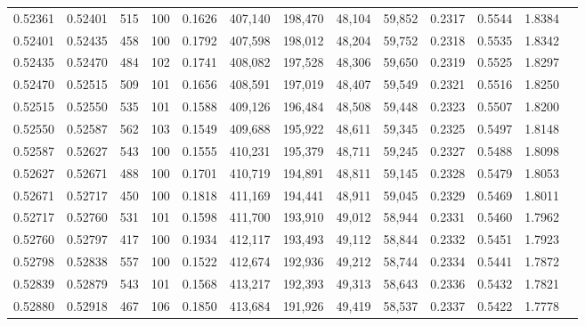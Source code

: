 \begin{tabular}{rrrrrrrrrrrrr}
0.52361 & 0.52401 &   515 & 100 &                                     0.1626 & 407,140 & 198,470 &  48,104 &  59,852 & 0.2317 & 0.5544 & 1.8384 \\
0.52401 & 0.52435 &   458 & 100 &                                     0.1792 & 407,598 & 198,012 &  48,204 &  59,752 & 0.2318 & 0.5535 & 1.8342 \\
0.52435 & 0.52470 &   484 & 102 &                                     0.1741 & 408,082 & 197,528 &  48,306 &  59,650 & 0.2319 & 0.5525 & 1.8297 \\
0.52470 & 0.52515 &   509 & 101 &                                     0.1656 & 408,591 & 197,019 &  48,407 &  59,549 & 0.2321 & 0.5516 & 1.8250 \\
0.52515 & 0.52550 &   535 & 101 &                                     0.1588 & 409,126 & 196,484 &  48,508 &  59,448 & 0.2323 & 0.5507 & 1.8200 \\
0.52550 & 0.52587 &   562 & 103 &                                     0.1549 & 409,688 & 195,922 &  48,611 &  59,345 & 0.2325 & 0.5497 & 1.8148 \\
0.52587 & 0.52627 &   543 & 100 &                                     0.1555 & 410,231 & 195,379 &  48,711 &  59,245 & 0.2327 & 0.5488 & 1.8098 \\
0.52627 & 0.52671 &   488 & 100 &                                     0.1701 & 410,719 & 194,891 &  48,811 &  59,145 & 0.2328 & 0.5479 & 1.8053 \\
0.52671 & 0.52717 &   450 & 100 &                                     0.1818 & 411,169 & 194,441 &  48,911 &  59,045 & 0.2329 & 0.5469 & 1.8011 \\
0.52717 & 0.52760 &   531 & 101 &                                     0.1598 & 411,700 & 193,910 &  49,012 &  58,944 & 0.2331 & 0.5460 & 1.7962 \\
0.52760 & 0.52797 &   417 & 100 &                                     0.1934 & 412,117 & 193,493 &  49,112 &  58,844 & 0.2332 & 0.5451 & 1.7923 \\
0.52798 & 0.52838 &   557 & 100 &                                     0.1522 & 412,674 & 192,936 &  49,212 &  58,744 & 0.2334 & 0.5441 & 1.7872 \\
0.52839 & 0.52879 &   543 & 101 &                                     0.1568 & 413,217 & 192,393 &  49,313 &  58,643 & 0.2336 & 0.5432 & 1.7821 \\
0.52880 & 0.52918 &   467 & 106 &                                     0.1850 & 413,684 & 191,926 &  49,419 &  58,537 & 0.2337 & 0.5422 & 1.7778 \\

\end{tabular}
